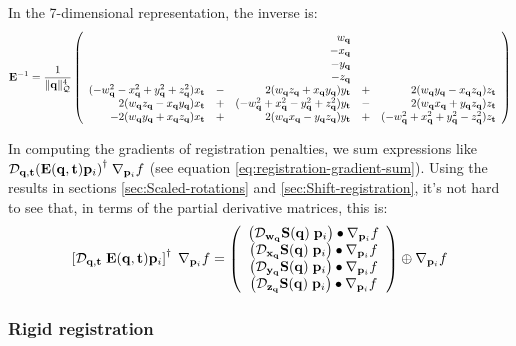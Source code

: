 In the 7-dimensional representation, the inverse is:
\begin{equation}
{\mathbf E}^{-1} =
{1 \over {\| {\mathbf q}\|_{\mathcal{Q}}^4}}
\left(
\begin{array}{rcrcr}
& &  w_{{\mathbf q}} & & \\
& & -x_{{\mathbf q}} & & \\
& & -y_{{\mathbf q}} & & \\
& & -z_{{\mathbf q}} & & \\
(-w_{{\mathbf q}}^2 - x_{{\mathbf q}}^2 + y_{{\mathbf q}}^2 + z_{{\mathbf q}}^2)
x_{{\mathbf t}}
&
-
&
2 (w_{{\mathbf q}}z_{{\mathbf q}} + x_{{\mathbf q}}y_{{\mathbf q}})
y_{{\mathbf t}}
&
+
&
2 (w_{{\mathbf q}}y_{{\mathbf q}} - x_{{\mathbf q}}z_{{\mathbf q}})
z_{{\mathbf t}}
\\
 2 (w_{{\mathbf q}}z_{{\mathbf q}} - x_{{\mathbf q}}y_{{\mathbf q}})
x_{{\mathbf t}}
&
+
&
(-w_{{\mathbf q}}^2 + x_{{\mathbf q}}^2 - y_{{\mathbf q}}^2 + z_{{\mathbf q}}^2)
y_{{\mathbf t}}
&
-
&
2 (w_{{\mathbf q}}x_{{\mathbf q}} + y_{{\mathbf q}}z_{{\mathbf q}})
z_{{\mathbf t}}
\\
- 2 (w_{{\mathbf q}}y_{{\mathbf q}} + x_{{\mathbf q}}z_{{\mathbf q}})
x_{{\mathbf t}}
&
+
&
2 (w_{{\mathbf q}}x_{{\mathbf q}} - y_{{\mathbf q}}z_{{\mathbf q}})
y_{{\mathbf t}}
&
+
&
(-w_{{\mathbf q}}^2 + x_{{\mathbf q}}^2 + y_{{\mathbf q}}^2 - z_{{\mathbf q}}^2)
z_{{\mathbf t}}
\end{array}
\right)
\end{equation}

In computing the gradients of registration penalties,
we sum expressions like
${\mathcal D}_{{\mathbf q}, {\mathbf t}}{\left( {\mathbf E}({\mathbf q},{\mathbf t}){\mathbf p}_i \right)}^{\dagger} \;
{\mathbf \nabla}_{{\mathbf p}_i}{f}$
(see equation \ref{eq:registration-gradient-sum}).
Using the results in sections
\ref{sec:Scaled-rotations}
and
\ref{sec:Shift-registration},
it's not hard to see that,
in terms of the partial derivative matrices,
this is:
\begin{equation}
\label{eq:euclidean-transform-gradient}
\left[
\Df{\q,\t}{\; \Eu(\q,\t)\p_i}
\right]^{\dagger} \;
\Gf{\p_i}{f}
=
\left(
\begin{array}{c}
\left( \Df{\w_{\q}}{\Sc(\q)} \; \p_i \right) \bullet \Gf{\p_i}{f} \\
\left( \Df{\x_{\q}}{\Sc(\q)} \; \p_i \right) \bullet \Gf{\p_i}{f} \\
\left( \Df{\y_{\q}}{\Sc(\q)} \; \p_i \right) \bullet \Gf{\p_i}{f} \\
\left( \Df{\z_{\q}}{\Sc(\q)} \; \p_i \right) \bullet \Gf{\p_i}{f} \\
\end{array}
\right)
\oplus
\Gf{\p_i}{f}
\end{equation}

\subsubsection{Rigid registration}
\label{sec:rigid-registration}


